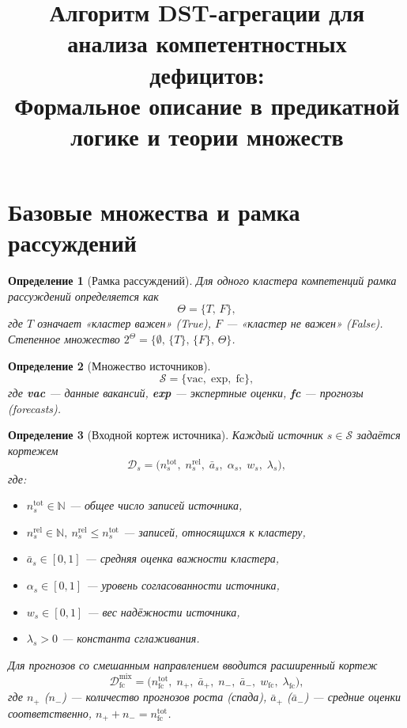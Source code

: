 \documentclass[12pt,a4paper]{article}
\title{%
  Алгоритм DST-агрегации для анализа компетентностных дефицитов:\\
  \large Формальное описание в предикатной логике и теории множеств
}
\author{}
\date{}
\newtheorem{definition}{Определение}
\begin{document}
\maketitle
\tableofcontents
\bigskip

\section{Базовые множества и рамка рассуждений}

\begin{definition}[Рамка рассуждений]
  Для одного кластера компетенций рамка рассуждений определяется как
  \[
    \Theta = \{T,\, F\},
  \]
  где $T$ означает «кластер важен» (True), $F$ --- «кластер не важен» (False).
  Степенное множество $2^\Theta = \{\emptyset,\, \{T\},\, \{F\},\, \Theta\}$.
\end{definition}

\begin{definition}[Множество источников]
  \[
    \mathcal{S} = \{\text{vac},\; \text{exp},\; \text{fc}\},
  \]
  где \textbf{vac} --- данные вакансий, \textbf{exp} --- экспертные оценки,
  \textbf{fc} --- прогнозы (forecasts).
\end{definition}

\begin{definition}[Входной кортеж источника]
  Каждый источник $s \in \mathcal{S}$ задаётся кортежем
  \[
    \mathcal{D}_s
      = \bigl(n_s^{\mathrm{tot}},\; n_s^{\mathrm{rel}},\;
              \bar{a}_s,\; \alpha_s,\; w_s,\; \lambda_s\bigr),
  \]
  где:
  \begin{itemize}
    \item $n_s^{\mathrm{tot}} \in \mathbb{N}$ --- общее число записей источника,
    \item $n_s^{\mathrm{rel}} \in \mathbb{N},\ n_s^{\mathrm{rel}} \le n_s^{\mathrm{tot}}$ --- записей, относящихся к кластеру,
    \item $\bar{a}_s \in [0,1]$ --- средняя оценка важности кластера,
    \item $\alpha_s \in [0,1]$ --- уровень согласованности источника,
    \item $w_s \in [0,1]$ --- вес надёжности источника,
    \item $\lambda_s > 0$ --- константа сглаживания.
  \end{itemize}

  Для прогнозов со смешанным направлением вводится расширенный кортеж
  \[
    \mathcal{D}_{\mathrm{fc}}^{\mathrm{mix}}
      = \bigl(n_{\mathrm{fc}}^{\mathrm{tot}},\;
              n_+,\; \bar{a}_+,\;
              n_-,\; \bar{a}_-,\;
              w_{\mathrm{fc}},\; \lambda_{\mathrm{fc}}\bigr),
  \]
  где $n_+$ ($n_-$) --- количество прогнозов роста (спада),
  $\bar{a}_+$ ($\bar{a}_-$) --- средние оценки соответственно,
  $n_+ + n_- = n_{\mathrm{fc}}^{\mathrm{tot}}$.

\end{definition}
\end{document}
